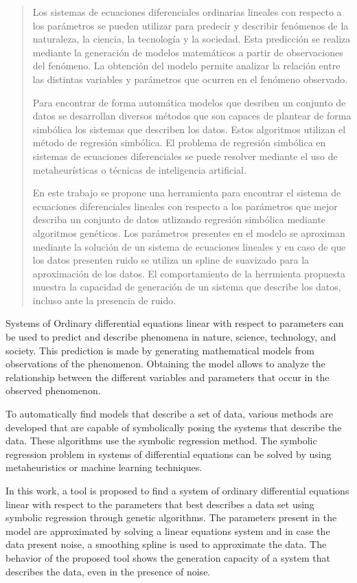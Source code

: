 \begin{abstract}

    Los sistemas de ecuaciones diferenciales ordinarias lineales con respecto a los parámetros se pueden utilizar para predecir y describir fenómenos de la naturaleza, la ciencia, la tecnología y la sociedad. Esta predicción se realiza mediante la generación de modelos matemáticos a partir de observaciones del fenómeno. La obtención del modelo permite analizar la relación entre las distintas variables y parámetros que ocurren en el fenómeno observado.

    Para encontrar de forma automática modelos que desriben un conjunto de datos se desarrollan diversos métodos que son capaces de plantear de forma simbólica los sistemas que describen los datos. Estos algoritmos utilizan el método de regresión simbólica. El problema de regresión simbólica en sistemas de ecuaciones diferenciales se puede resolver mediante el uso de metaheurísticas o técnicas de inteligencia artificial.

    En este trabajo se propone una herramienta para encontrar el sistema de ecuaciones diferenciales lineales con respecto a los parámetros que mejor describa un conjunto de datos utlizando regresión simbólica mediante algoritmos genéticos. Los parámetros presentes en el modelo se aproximan mediante la solución de un sistema de ecuaciones lineales y en caso de que los datos presenten ruido se utiliza un spline de suavizado para la aproximación de los datos. El comportamiento de la herrmienta propuesta muestra la capacidad de generación de un sistema que describe los datos, incluso ante la presencia de ruido.


\end{abstract}

\begin{enabstract}

    Systems of Ordinary differential equations linear with respect to parameters can be used to predict and describe phenomena in nature, science, technology, and society. This prediction is made by generating mathematical models from observations of the phenomenon. Obtaining the model allows to analyze the relationship between the different variables and parameters that occur in the observed phenomenon.

    To automatically find models that describe a set of data, various methods are developed that are capable of symbolically posing the systems that describe the data. These algorithms use the symbolic regression method. The symbolic regression problem in systems of differential equations can be solved by using metaheuristics or machine learning techniques.

    In this work, a tool is proposed to find a system of ordinary differential equations linear with respect to the parameters that best describes a data set using symbolic regression through genetic algorithms. The parameters present in the model are approximated by solving a linear equations system and in case the data present noise, a smoothing spline is used to approximate the data. The behavior of the proposed tool shows the generation capacity of a system that describes the data, even in the presence of noise.

\end{enabstract}
